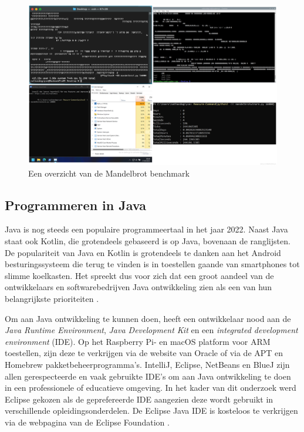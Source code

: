 \begin{figure}[!h]
	\centering
	\includegraphics[width=\linewidth]{img/mandelbrot_benchmark.png}
	\caption{Een overzicht van de Mandelbrot benchmark}
\end{figure}

\subsection{Programmeren in Java}
Java is nog steeds een populaire programmeertaal in het jaar 2022. Naast Java staat ook Kotlin, die grotendeels gebaseerd is op Java, bovenaan de ranglijsten. De populariteit van Java en Kotlin is grotendeels te danken aan het Android besturingssysteem die terug te vinden is in toestellen gaande van smartphones tot slimme koelkasten. Het spreekt dus voor zich dat een groot aandeel van de ontwikkelaars en softwarebedrijven Java ontwikkeling zien als een van hun belangrijkste prioriteiten \autocite{StackOverflow2020}. 

Om aan Java ontwikkeling te kunnen doen, heeft een ontwikkelaar nood aan de \textit{Java Runtime Environment}, \textit{Java Development Kit} en een\textit{ integrated development environment} (IDE). Op het Raspberry Pi- en macOS platform voor ARM toestellen, zijn deze te verkrijgen via de website van Oracle of via de APT en Homebrew pakketbeheerprogramma's. IntelliJ, Eclipse, NetBeans en BlueJ zijn allen gerespecteerde en vaak gebruikte IDE’s om aan Java ontwikkeling te doen in een professionele of educatieve omgeving. In het kader van dit onderzoek werd Eclipse gekozen als de geprefereerde IDE aangezien deze wordt gebruikt in verschillende opleidingsonderdelen. De Eclipse Java IDE is kosteloos te verkrijgen via de webpagina van de Eclipse Foundation \autocite{EclipseFoundation2022}.

